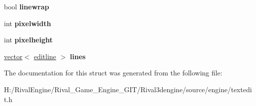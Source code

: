 \begin{DoxyCompactItemize}
\mbox{\label{structeditor_a37594098ee488498295473f3295ce646}} 
bool {\bfseries linewrap}
\item 
\mbox{\label{structeditor_a139a8e5b3f2e85ea95c3f38f92e8e82a}} 
int {\bfseries pixelwidth}
\item 
\mbox{\label{structeditor_a44929d2a5da7cfebda79c7673a95e34e}} 
int {\bfseries pixelheight}
\item 
\mbox{\label{structeditor_a3fa0c216055a1c485d8f443122a2d083}} 
\hyperlink{structvector}{vector}$<$ \hyperlink{structeditline}{editline} $>$ {\bfseries lines}
\end{DoxyCompactItemize}


The documentation for this struct was generated from the following file\+:\begin{DoxyCompactItemize}
\item 
H\+:/\+Rival\+Engine/\+Rival\+\_\+\+Game\+\_\+\+Engine\+\_\+\+G\+I\+T/\+Rival3dengine/source/engine/textedit.\+h\end{DoxyCompactItemize}
